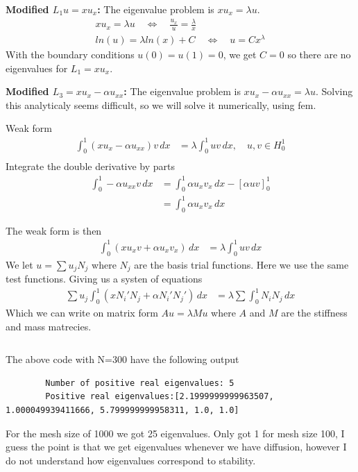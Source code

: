 \documentclass[a4paper,12pt]{article}
\theoremstyle{exerciseStyle}
\theoremstyle{solutionStyle}
\begin{document}
\begin{solution}{5.6}
    \medskip\noindent\textbf{Modified $L_1 u = x u_x$:}
    The eigenvalue problem is $x u_x = \lambda u$.
    \begin{gather*}
        x u_x = \lambda u \quad \Longleftrightarrow \quad \frac{u_x}{u} = \frac{\lambda}{x} \\
        ln(u) = \lambda ln(x) + C \quad \Longleftrightarrow \quad u = C x^{\lambda}
    \end{gather*}%
    With the boundary conditions $u(0) = u(1) = 0$, we get $C = 0$ so there are no eigenvalues for $L_1 = x u_x$.

    \medskip\noindent\textbf{Modified $L_3 = x u_x - \alpha u_{xx} $:}
    The eigenvalue problem is $x u_x - \alpha u_{xx} = \lambda u$.
    Solving this analyticaly seems difficult, so we will solve it numerically, using fem.

    Weak form
    \begin{align*}
        \int_0^1 (x u_x - \alpha u_{xx}) v \, dx & = \lambda \int_0^1 u v \, dx, \quad u, v \in H_0^1 \\
    \end{align*}%
    Integrate the double derivative by parts
    \begin{align*}
        \int_0^1  - \alpha u_{xx} v \, dx & =   \int_0^1 \alpha u_x v_x \, dx - [ \alpha u v ]_0^1 \\
                                          & = \int_0^1 \alpha u_x v_x \, dx
    \end{align*}

    The weak form is then
    \begin{align*}
        \int_0^1 (x u_x v + \alpha u_x v_x) \, dx & = \lambda \int_0^1 u v \, dx
    \end{align*}%
    We let $ u = \sum u_j N_j$ where $N_j$ are the basis trial functions. Here we use the same test functions.
    Giving us a systen of equations
    \begin{align*}
        \sum u_j \int_0^1 (x N_i' N_j + \alpha N_i' N_j') \, dx & = \lambda \sum \int_0^1 N_i N_j \, dx
    \end{align*}%
    Which we can write on matrix form $A u = \lambda M u$ where $A$ and $M$ are the stiffness and mass matrecies.

    \inputminted[linenos, breaklines, frame=lines]{python}{ex56.py}
    The above code with N=300 have the following output
    \begin{verbatim}
        Number of positive real eigenvalues: 5
        Positive real eigenvalues:[2.1999999999963507, 1.000049939411666, 5.799999999958311, 1.0, 1.0]
    \end{verbatim}


    For the mesh size of 1000 we got 25 eigenvalues. Only got 1 for mesh size 100, I guess the point is that we get eigenvalues
    whenever we have diffusion, however I do not understand how eigenvalues correspond to stability.


\end{solution}
\end{document}
